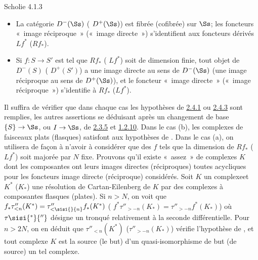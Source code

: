 \documentclass[10pt]{../fichiers-configuration-latex/smfart}
\begin{document}
\begin{enonce*}{Scholie 4.1.3}
\begin{enumerate}
\begin{itemize}
\item[(ii)] La catégorie $D^{-}(\Ss)$ (\resp
$D^{+}(\Ss)$) est fibrée (\resp cofibrée) sur $\Ss$;
les foncteurs « image réciproque »  (\resp « image directe »)
s'identifient aux foncteurs dérivés $Lf^{\ast}$ (\resp $Rf_{\ast}$).

\item[(iii)] Si $f:S\rightarrow S'$ est tel que $Rf_{\ast}$ (\resp
$Lf^{\ast}$) soit de dimension finie, tout objet de $D^{-}(S)$ (\resp
$D^{+}(S')$) a une image directe au sens de $D^{-}(\Ss)$
(\resp une image réciproque au sens de $D^{+}(\Ss)$), et le
foncteur « image directe »  (\resp « image réciproque »)
s'identifie à $Rf_{\ast}$ (\resp $Lf^{\ast}$).
\end{itemize}
\end{enumerate}
\end{enonce*}

Il suffira de vérifier que dans chaque cas les hypothèses de
\hyperref[XVII.prop2.4.1]{2.4.1} ou
\hyperref[XVII.prop2.4.3]{2.4.3} sont remplies, les autres assertions se déduisant après un
changement de base $\{S\}\rightarrow \Ss$, ou $I\rightarrow
\Ss$, de \hyperref[XVII.prop2.3.5]{2.3.5} et \hyperref[XVII.prop1.2.10]{1.2.10}.
Dans le cas (b), les complexes de
faisceaux plats (\resp flasques) satisfont aux hypothèses de
. Dans le cas (a), on utilisera 
de façon à n'avoir à
considérer que des $f$ tels que la dimension de $Rf_{\ast}$ (\resp
$Lf^{\ast}$) soit majorée par $N$ fixe. Prouvons qu'il existe « assez »  de complexes $K$ dont les composantes ont leurs images
directes (\resp réciproques) toutes acycliques pour les foncteurs
image directe (réciproque) considérés. Soit $K$ un
complexe\pageoriginale et $K^{\ast}$ (\resp $K_{\ast}$) une résolution
de Cartan-Eilenberg de $K$ par des complexes à composantes flasques
(\resp plates). Si $n>N$, on voit que
$f_{\ast}\tau''_{<n}(K^{\ast})=\tau''_{<\sisi{}{n}}f_{\ast}(K^{\ast})$ (\resp
$f^{\ast}\tau''_{>-n}(K_{\ast})=\tau''_{>-n}f^{\ast}(K_{\ast})$) où
$\tau\sisi{^{\ast}}{''}$ désigne un tronqué relativement à la seconde
différentielle. Pour $n>2N$, on en déduit que $\tau''_{<n}(K^{\ast})$
(\resp $\tau''_{>-n}(K_{\ast})$) vérifie l'hypothèse de , et tout
complexe $K$ est la source (\resp le but) d'un quasi-isomorphisme de
but (\resp de source) un tel complexe.
\end{document}

